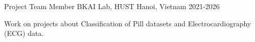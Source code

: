 \begin{cventries}
  \cventry
    {Project Team Member} %
    {BKAI Lab, HUST} %
    {Hanoi, Vietnam} %
    {2021-2026} %
    {
      \begin{cvitems} %
        \item {Work on projects about Classification of Pill datasets and Electrocardiography (ECG) data.}
      \end{cvitems}
    }


\end{cventries}
